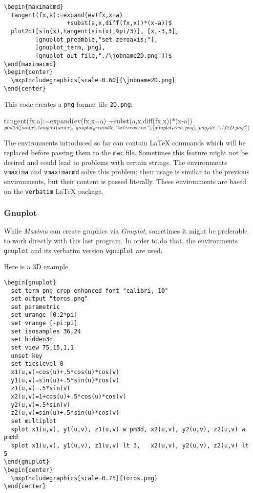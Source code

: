\documentclass[11pt,a4paper]{article}
\def\Maxima{\emph{Maxima}}
\def\Gnuplot{\emph{Gnuplot}}
\begin{document}
\begin{verbatim}
\begin{maximacmd}
  tangent(fx,a):=expand(ev(fx,x=a)
                  +subst(a,x,diff(fx,x))*(x-a))$
  plot2d([sin(x),tangent(sin(x),%pi/3)], [x,-3,3],
         [gnuplot_preamble,"set zeroaxis;"],
         [gnuplot_term, png],
         [gnuplot_out_file,"./\jobname2D.png"])$
\end{maximacmd}
\begin{center}
  \mxpIncludegraphics[scale=0.60]{\jobname2D.png}
\end{center}
\end{verbatim}   

This code creates a \verb|png| format file \texttt{\jobname2D.png}:
\begin{maximacmd}
  tangent(fx,a):=expand(ev(fx,x=a)
                  +subst(a,x,diff(fx,x))*(x-a))$
  plot2d([sin(x),tangent(sin(x),%
         [gnuplot_preamble,"set zeroaxis;"],
         [gnuplot_term, png],
         [png_file,"./\jobname2D.png"])$
\end{maximacmd}
\begin{center}
\end{center}

The environments introduced so far can contain \LaTeX{} commands which
will be replaced before passing them to the \texttt{mac}
file. Sometimes this feature might not be desired and could lead to
problems with certain strings. The environments \texttt{vmaxima} and
\texttt{vmaximacmd} solve this problem; their usage is similar to the
previous environments, but their content is passed literally. These
environments are based on the \texttt{verbatim} \LaTeX{} package.

\pagebreak

\subsubsection{Gnuplot}
While \Maxima{} can create graphics via \Gnuplot{}, sometimes it might
be preferable to work directly with this last program. In order to do
that, the environments \texttt{gnuplot} and its verbatim version
\texttt{vgnuplot} are used.

Here is a 3D example
\begin{verbatim}
\begin{gnuplot}
  set term png crop enhanced font "calibri, 10"
  set output "toros.png"
  set parametric
  set urange [0:2*pi]
  set vrange [-pi:pi]
  set isosamples 36,24
  set hidden3d
  set view 75,15,1,1
  unset key
  set ticslevel 0
  x1(u,v)=cos(u)+.5*cos(u)*cos(v)
  y1(u,v)=sin(u)+.5*sin(u)*cos(v)
  z1(u,v)=.5*sin(v)
  x2(u,v)=1+cos(u)+.5*cos(u)*cos(v)
  y2(u,v)=.5*sin(v)
  z2(u,v)=sin(u)+.5*sin(u)*cos(v)
  set multiplot
  splot x1(u,v), y1(u,v), z1(u,v) w pm3d, x2(u,v), y2(u,v), z2(u,v) w pm3d
  splot x1(u,v), y1(u,v), z1(u,v) lt 3,   x2(u,v), y2(u,v), z2(u,v) lt 5 
\end{gnuplot}
\begin{center}
  \mxpIncludegraphics[scale=0.75]{toros.png}
\end{center}
\end{verbatim}
\end{document}
